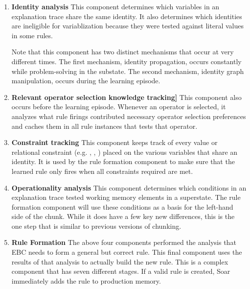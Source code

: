 \begin{enumerate}
	\item \textbf{Identity analysis}  \newline
	This component determines which variables in an explanation trace share the same identity.  It also determines which identities are ineligible for variablization because they were tested against literal values in some rules.

	Note that this component has two distinct mechanisms that occur at very different times.  The first mechanism, identity propagation, occurs constantly while problem-solving in the substate.  The second mechanism, identity graph manipulation, occurs during the learning episode.

	\item \textbf{Relevant operator selection knowledge tracking]} \newline
	This component also occurs before the learning episode.  Whenever an operator is selected, it analyzes what rule firings contributed necessary operator selection preferences and caches them in all rule instances that tests that operator.

	\item \textbf{Constraint tracking} \newline
	This component keeps track of every value or relational constraint (e.g. , , ) placed on the various variables that share an identity.  It is used by the rule formation component to make sure that the learned rule only fires when all constraints required are met.

	\item \textbf{Operationality analysis} \newline
	This component determines which conditions in an explanation trace tested working memory elements in a superstate.  The rule formation component will use these conditions as a basis for the left-hand side of the chunk.  While it does have a few key new differences, this is the one step that is similar to previous versions of chunking.

	\item \textbf{Rule Formation} \newline
	The above four components performed the analysis that EBC needs to form a general but correct rule.  This final component uses the results of that analysis to actually build the new rule.  This is a complex component that has seven different stages.  If a valid rule is created, Soar immediately adds the rule to production memory.
\end{enumerate}

